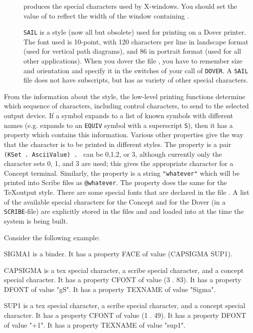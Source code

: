 \begin{description}
\item [ ] produces the special characters used by X-windows. You should
set the value of  to reflect the width of the window containing 
\tps.

\item [ ] {\tt SAIL} is a style (now all but obsolete) used for printing
on a Dover printer. The font used is 10-point, with 120 characters 
per line in landscape format (used for vertical path diagrams), and 86 in portrait format
(used for all other applications).
When you dover the file , you have to remember size and orientation and
specify it in the switches of your call of {\tt DOVER}.
A {\tt SAIL} file does not have subscripts, but has as variety
of other special characters.

\end{description}

From the information about the style, the low-level printing functions
determine which sequence of characters, including control characters, to
send to the selected output device.  If a symbol expands to a list of known 
symbols with different names (e.g.  expands to an {\tt EQUIV} 
symbol with a superscript {\tt S}), then it has a property 
which contains this information. Various other properties give the way that the character 
is to be printed in different styles.
The  property
is a pair {\tt (KSet . AsciiValue) . } can be 0,1,2, or 3,
although currently only the character sets 0, 1, and 3 are used; this gives the 
appropriate character for a Concept terminal.
Similarly, the  property is a string {\tt "whatever"} which will be printed
into Scribe files as {\tt @whatever}. The  property does the
same for the \TeX output style.
There are some special fonts that are declared in the file
.  A list of the available special characters for
the Concept and for the Dover (in a {\tt SCRIBE}-file) are explicitly stored
in the files  and  and loaded into
\TPS at the time the system is being built.

Consider the following example:
\begin{Example}
SIGMA1 is a binder.
It has a property FACE of value (CAPSIGMA SUP1).

CAPSIGMA is a tex special character, a scribe special character, 
and a concept special character.
It has a property CFONT of value (3 .  83).
It has a property DFONT of value "g{S}".
It has a property TEXNAME of value "Sigma".

SUP1 is a tex special character, a scribe special character, 
and a concept special character.
It has a property CFONT of value (1 .  49).
It has a property DFONT of value "+{1}".
It has a property TEXNAME of value "sup1".
\end{Example}

